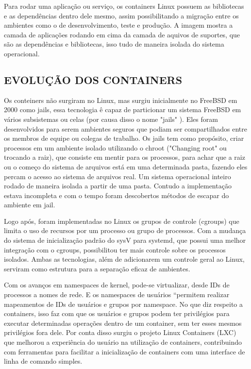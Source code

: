 Para rodar uma aplicação ou serviço, os containers Linux possuem as bibliotecas e as dependências dentro dele mesmo, assim possibilitando a migração entre os ambientes como o de desenvolvimento, teste e produção. A imagem mostra a camada de aplicações rodando em cima da camada de aquivos de suportes, que são as dependências e bibliotecas, isso tudo de maneira isolada do sistema operacional.    


\subsection{EVOLUÇÃO DOS CONTAINERS}

Os conteiners não surgiram no Linux, mas surgiu inicialmente no FreeBSD em 2000 como jails, essa tecnologia ê capaz de particionar um sistema FreeBSD em vários subsistemas ou celas (por causa disso o nome "jails" ). Eles foram desenvolvidos para serem ambientes seguros que podiam ser compartilhados entre os membros de equipe ou colegas de trabalho. Os jails tem como propósito, criar processos em um ambiente isolado utilizando o chroot ("Changing root" ou trocando a raiz), que consiste em mentir para os processos, para achar que a raiz ou o começo do sistema de arquivos está em uma determinada pasta, fazendo eles percam o acesso ao sistema de arquivos real. Um sistema operacional inteiro rodado  de maneira isolada a partir de uma pasta.  Contudo a implementação estava incompleta e com o tempo foram descobertos métodos de escapar do ambiente em jail. 

Logo após, foram implementadas no Linux os grupos de controle (cgroups) que limita o uso de recursos por um processo ou grupo de processos. Com a mudança do sistema de inicialização padrão do sysV para systemd, que possui uma melhor integração com o cgroups, possibilitou ter mais controle sobre os processos isolados. Ambas as tecnologias, além de adicionarem um controle geral ao Linux, serviram como estrutura para a separação eficaz de ambientes.

Com os avanços em namespaces de kernel, pode-se virtualizar, desde IDs de processos a nomes de rede. E os namespaces de usuários “permitem realizar mapeamentos de IDs de usuários e grupos por namespace. No que diz respeito a containers, isso faz com que os usuários e grupos podem ter privilégios para executar determinadas operações dentro de um container, sem ter esses mesmos privilégios fora dele. Por conta disso surgiu o projeto Linux Containers (LXC) que melhorou a experiência do usuário na utilização de containers, contribuindo com ferramentas para facilitar a inicialização de containers com uma interface de linha de comando simples.

